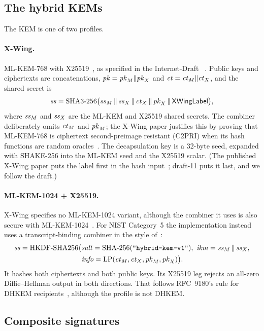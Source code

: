 \subsection{The hybrid KEMs}\label{sec:kems}

The KEM is one of two profiles.

\paragraph{X-Wing.} ML-KEM-768 with X25519~\cite{RFC7748}, as specified in
the Internet-Draft ~\cite{XWingDraft}. Public keys and
ciphertexts are concatenations, $\mathit{pk} = \mathit{pk}_M \| \mathit{pk}_X$ and
$\mathit{ct} = \mathit{ct}_M \| \mathit{ct}_X$, and the shared secret is
\[
  \mathit{ss} = \text{SHA3-256}\bigl(\mathit{ss}_M \,\|\, \mathit{ss}_X \,\|\, \mathit{ct}_X \,\|\, \mathit{pk}_X \,\|\, \mathsf{XWingLabel}\bigr),
\]
where $\mathit{ss}_M$ and $\mathit{ss}_X$ are the ML-KEM and X25519 shared secrets. The
combiner deliberately omits $\mathit{ct}_M$ and $\mathit{pk}_M$; the X-Wing paper justifies
this by proving that ML-KEM-768 is ciphertext second-preimage resistant
(C2PRI) when its hash functions are random oracles~\cite[Thm.~3]{XWing}. The
decapsulation key is a 32-byte seed, expanded with SHAKE-256 into the ML-KEM
seed and the X25519 scalar. (The published X-Wing paper puts the label first
in the hash input~\cite{XWing}; draft-11 puts it last, and we follow the
draft.)

\paragraph{ML-KEM-1024 + X25519.} X-Wing specifies no ML-KEM-1024 variant,
although the combiner it uses is also secure with
ML-KEM-1024~\cite{Starfighters}. For NIST Category~5 the implementation
instead uses a transcript-binding combiner in the style of~\cite{BBFGS19}:
\begin{align*}
  \mathit{ss} = \mathrm{HKDF\text{-}SHA256}\bigl(
    &\mathit{salt} = \text{SHA-256}(\text{\texttt{"hybrid-kem-v1"}}),\
     \mathit{ikm} = \mathit{ss}_M \,\|\, \mathit{ss}_X,\\
    &\mathit{info} = \mathrm{LP}(\mathit{ct}_M, \mathit{ct}_X, \mathit{pk}_M, \mathit{pk}_X)\bigr).
\end{align*}
It hashes both ciphertexts and both public keys. Its X25519 leg rejects an
all-zero Diffie--Hellman output in both directions. That follows RFC~9180's
rule for DHKEM recipients~\cite[\S7.1.4]{RFC9180}, although the profile is
not DHKEM.

\subsection{Composite signatures}\label{sec:composite}

